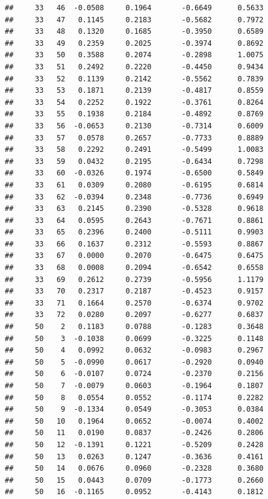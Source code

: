 \documentclass[
]{article}
\begin{document}
\begin{verbatim}
##     33   46  -0.0508     0.1964       -0.6649      0.5633 
##     33   47   0.1145     0.2183       -0.5682      0.7972 
##     33   48   0.1320     0.1685       -0.3950      0.6589 
##     33   49   0.2359     0.2025       -0.3974      0.8692 
##     33   50   0.3588     0.2074       -0.2898      1.0075 
##     33   51   0.2492     0.2220       -0.4450      0.9434 
##     33   52   0.1139     0.2142       -0.5562      0.7839 
##     33   53   0.1871     0.2139       -0.4817      0.8559 
##     33   54   0.2252     0.1922       -0.3761      0.8264 
##     33   55   0.1938     0.2184       -0.4892      0.8769 
##     33   56  -0.0653     0.2130       -0.7314      0.6009 
##     33   57   0.0578     0.2657       -0.7733      0.8889 
##     33   58   0.2292     0.2491       -0.5499      1.0083 
##     33   59   0.0432     0.2195       -0.6434      0.7298 
##     33   60  -0.0326     0.1974       -0.6500      0.5849 
##     33   61   0.0309     0.2080       -0.6195      0.6814 
##     33   62  -0.0394     0.2348       -0.7736      0.6949 
##     33   63   0.2145     0.2390       -0.5328      0.9618 
##     33   64   0.0595     0.2643       -0.7671      0.8861 
##     33   65   0.2396     0.2400       -0.5111      0.9903 
##     33   66   0.1637     0.2312       -0.5593      0.8867 
##     33   67   0.0000     0.2070       -0.6475      0.6475 
##     33   68   0.0008     0.2094       -0.6542      0.6558 
##     33   69   0.2612     0.2739       -0.5956      1.1179 
##     33   70   0.2317     0.2187       -0.4523      0.9157 
##     33   71   0.1664     0.2570       -0.6374      0.9702 
##     33   72   0.0280     0.2097       -0.6277      0.6837 
##     50    2   0.1183     0.0788       -0.1283      0.3648 
##     50    3  -0.1038     0.0699       -0.3225      0.1148 
##     50    4   0.0992     0.0632       -0.0983      0.2967 
##     50    5  -0.0990     0.0617       -0.2920      0.0940 
##     50    6  -0.0107     0.0724       -0.2370      0.2156 
##     50    7  -0.0079     0.0603       -0.1964      0.1807 
##     50    8   0.0554     0.0552       -0.1174      0.2282 
##     50    9  -0.1334     0.0549       -0.3053      0.0384 
##     50   10   0.1964     0.0652       -0.0074      0.4002 
##     50   11   0.0190     0.0837       -0.2426      0.2806 
##     50   12  -0.1391     0.1221       -0.5209      0.2428 
##     50   13   0.0263     0.1247       -0.3636      0.4161 
##     50   14   0.0676     0.0960       -0.2328      0.3680 
##     50   15   0.0443     0.0709       -0.1773      0.2660 
##     50   16  -0.1165     0.0952       -0.4143      0.1812 

\end{verbatim}
\end{document}
